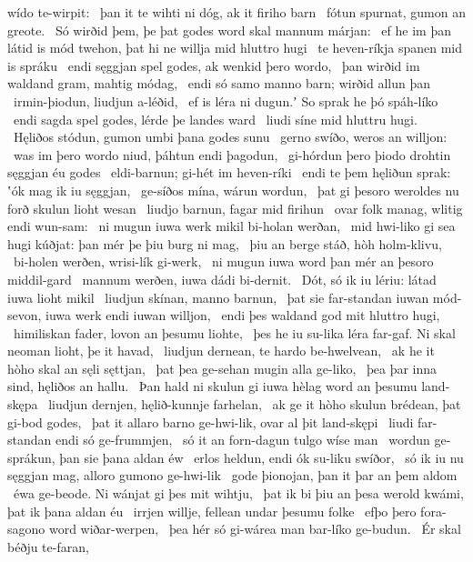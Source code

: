 wído te-wirpit: \hld\ þan it te wihti ni dóg,
ak it firiho barn \hld\ fótun spurnat,
gumon an greote. \hld\ Só wirðid þem, þe þat godes word skal
mannum márjan: \hld\ ef he im þan látid is mód twehon,
þat hi ne willja mid hluttro hugi \hld\ te heven-ríkja
spanen mid is spráku \hld\ endi sęggjan spel godes,
ak wenkid þero wordo, \hld\ þan wirðid im waldand gram,
mahtig módag, \hld\ endi só samo manno barn;
wirðid allun þan \hld\ irmin-þiodun,
liudjun a-léðid, \hld\ ef is léra ni dugun.ʼ
So sprak he þó spáh-líko \hld\ endi sagda spel godes,
lérde þe landes ward \hld\ liudi síne
mid hluttru hugi. \hld\ Hęliðos stódun,
gumon umbi þana godes sunu \hld\ gerno swíðo,
weros an willjon: \hld\ was im þero wordo niud,
þáhtun endi þagodun, \hld\ gi-hórdun þero þiodo drohtin
sęggjan éu godes \hld\ eldi-barnun;
gi-hét im heven-ríki \hld\ endi te þem hęliðun sprak:
ʽók mag ik iu sęggjan, \hld\ ge-síðos mína,
wárun wordun, \hld\ þat gi þesoro weroldes nu forð
skulun lioht wesan \hld\ liudjo barnun,
fagar mid firihun \hld\ ovar folk manag,
wlitig endi wun-sam: \hld\ ni mugun iuwa werk mikil
bi-holan werðan, \hld\ mid hwi-liko gi sea hugi kúðjat:
þan mér þe þiu burg ni mag, \hld\ þiu an berge stáð,
hòh holm-klivu, \hld\ bi-holen werðen,
wrisi-lík gi-werk, \hld\ ni mugun iuwa word þan mér
an þesoro middil-gard \hld\ mannum werðen,
iuwa dádi bi-dernit. \hld\ Dót, só ik iu lériu:
látad iuwa lioht mikil \hld\ liudjun skínan,
manno barnun, \hld\ þat sie far-standan iuwan mód-sevon,
iuwa werk endi iuwan willjon, \hld\ endi þes waldand god
mit hluttro hugi, \hld\ himiliskan fader,
lovon an þesumu liohte, \hld\ þes he iu su-lika léra far-gaf.
Ni skal neoman lioht, þe it havad, \hld\ liudjun dernean,
te hardo be-hwelvean, \hld\ ak he it hòho skal
an sęli sęttjan, \hld\ þat þea ge-sehan mugin
alla ge-liko, \hld\ þea þar inna sind,
hęliðos an hallu. \hld\ Þan hald ni skulun gi iuwa hèlag word
an þesumu land-skępa \hld\ liudjun dernjen,
hęlið-kunnje farhelan, \hld\ ak ge it hòho skulun
brédean, þat gi-bod godes, \hld\ þat it allaro barno ge-hwi-lik,
ovar al þit land-skępi \hld\ liudi far-standan
endi só ge-frummjen, \hld\ só it an forn-dagun
tulgo wíse man \hld\ wordun ge-sprákun,
þan sie þana aldan éw \hld\ erlos heldun,
endi ók su-liku swíðor, \hld\ só ik iu nu sęggjan mag,
alloro gumono ge-hwi-lik \hld\ gode þionojan,
þan it þar an þem aldom \hld\ éwa ge-beode.
Ni wánjat gi þes mit wihtju, \hld\ þat ik bi þiu an þesa werold kwámi,
þat ik þana aldan éu \hld\ irrjen willje,
fellean undar þesumu folke \hld\ efþo þero fora-sagono
word wiðar-werpen, \hld\ þea hér só gi-wárea man
bar-líko ge-budun. \hld\ Ér skal béðju te-faran,

